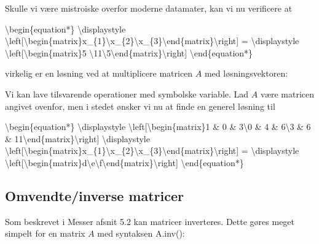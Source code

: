 \documentclass[letterpaper,10pt,english]{jupyterBook}
\begin{document}
\noindent{}

Skulle vi være mistroiske overfor moderne datamater, kan vi nu verificere at

\textbackslash{}begin\{equation*\}
\textbackslash{}displaystyle \textbackslash{}left{[}\textbackslash{}begin\{matrix\}x\_\{1\}\textbackslash{}x\_\{2\}\textbackslash{}x\_\{3\}\textbackslash{}end\{matrix\}\textbackslash{}right{]} = \textbackslash{}displaystyle \textbackslash{}left{[}\textbackslash{}begin\{matrix\}5 \textbackslash{}11\textbackslash{}5\textbackslash{}end\{matrix\}\textbackslash{}right{]}
\textbackslash{}end\{equation*\}

virkelig er en løsning ved at multiplicere matricen \(A\) med løsningsvektoren:

\begin{sphinxVerbatim}[commandchars=\\\{\}]
  
\end{sphinxVerbatim}

\noindent{}

Vi kan lave tilsvarende operationer med symbolske variable. Lad \(A\) være matricen angivet ovenfor, men i stedet ønsker vi nu at finde en generel løsning til

\textbackslash{}begin\{equation*\}
\textbackslash{}displaystyle \textbackslash{}left{[}\textbackslash{}begin\{matrix\}1 \& 0 \& 3\textbackslash{}0 \& 4 \& 6\textbackslash{}3 \& 6 \& 11\textbackslash{}end\{matrix\}\textbackslash{}right{]} \textbackslash{}displaystyle \textbackslash{}left{[}\textbackslash{}begin\{matrix\}x\_\{1\}\textbackslash{}x\_\{2\}\textbackslash{}x\_\{3\}\textbackslash{}end\{matrix\}\textbackslash{}right{]} = \textbackslash{}displaystyle \textbackslash{}left{[}\textbackslash{}begin\{matrix\}d\textbackslash{}e\textbackslash{}f\textbackslash{}end\{matrix\}\textbackslash{}right{]}
\textbackslash{}end\{equation*\}


\subsection{Omvendte/inverse matricer}
\label{\detokenize{notebooks/sympy/Notebook_LinAlg1:omvendte-inverse-matricer}}
Som beskrevet i Messer afsnit 5.2 kan matricer inverteres. Dette gøres meget simpelt for en matrix \(A\) med syntaksen A.inv():

\begin{sphinxVerbatim}[commandchars=\\\{\}]
\end{sphinxVerbatim}
\end{document}
